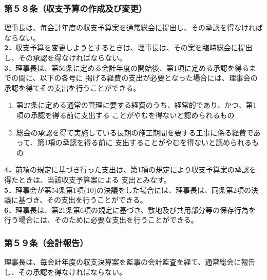 \documentclass[
  luatex,
  paper=a4paper,
  fontsize=11pt,
  jafontsize=11pt,
  jlreq_notes,
]{jlreq}
\begin{document}
  \subsubsection*{第５８条（収支予算の作成及び変更）}
  理事長は、毎会計年度の収支予算案を通常総会に提出し、その承認を得なければならない。\\
  \textbf{2．}収支予算を変更しようとするときは、理事長は、その案を臨時総会に提出し、その承認を得なければならない。\\
  \textbf{3．}理事長は、第56条に定める会計年度の開始後、第1項に定める承認を得るまでの間に、以下の各号に
  掲げる経費の支出が必要となった場合には、理事会の承認を得てその支出を行うことができる。
  \begin{enumerate}
  \item 第27条に定める通常の管理に要する経費のうち、経常的であり、かつ、第1項の承認を得る前に支出する
        ことがやむを得ないと認められるもの
  \item 総会の承認を得て実施している長期の施工期間を要する工事に係る経費であって、第1項の承認を得る前に
        支出することがやむを得ないと認められるもの
  \end{enumerate}
  \textbf{4．}前項の規定に基づき行った支出は、第1項の規定により収支予算案の承認を得たときは、当該収支予算案による
  支出とみなす。\\
  \textbf{5．}理事会が第54条第1項(10)の決議をした場合には、理事長は、同条第2項の決議に基づき、その支出を行うことができる。\\
  \textbf{6．}理事長は、第21条第6項の規定に基づき、敷地及び共用部分等の保存行為を行う場合には、そのために必要な支出を行うことができる。
  \subsubsection*{第５９条（会計報告）}
  理事長は、毎会計年度の収支決算案を監事の会計監査を経て、通常総会に報告し、その承認を得なければならない。
\end{document}
